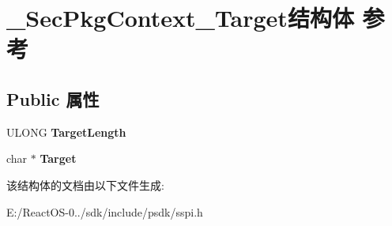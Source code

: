 \hypertarget{struct___sec_pkg_context___target}{}\section{\+\_\+\+Sec\+Pkg\+Context\+\_\+\+Target结构体 参考}
\label{struct___sec_pkg_context___target}
\subsection*{Public 属性}
\begin{DoxyCompactItemize}
\item 
\mbox{\label{struct___sec_pkg_context___target_a000ea47ac7d437854948c870f0c69e6a}} 
U\+L\+O\+NG {\bfseries Target\+Length}
\item 
\mbox{\label{struct___sec_pkg_context___target_abaaef317828a658fb45a37ff22f85a8a}} 
char $\ast$ {\bfseries Target}
\end{DoxyCompactItemize}


该结构体的文档由以下文件生成\+:\begin{DoxyCompactItemize}
\item 
E\+:/\+React\+O\+S-\/0../sdk/include/psdk/sspi.\+h\end{DoxyCompactItemize}

